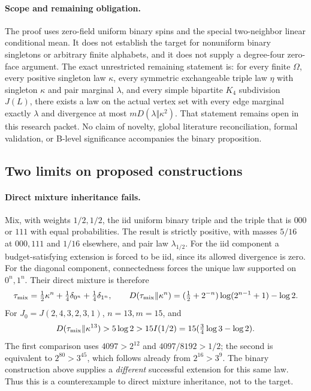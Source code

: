 \paragraph{Scope and remaining obligation.}
The proof uses zero-field uniform binary spins and the special
two-neighbor linear conditional mean.  It does not establish the
target for nonuniform binary singletons or arbitrary finite alphabets,
and it does not supply a degree-four zero-face argument.
The exact unrestricted remaining statement is: for every finite
$\Omega$, every positive singleton law $\kappa$, every symmetric
exchangeable triple law $\eta$ with singleton $\kappa$ and pair marginal
$\lambda$, and every simple bipartite $K_4$ subdivision $J(L)$, there
exists a law on the actual vertex set with every edge marginal exactly
$\lambda$ and divergence at most $mD(\lambda\Vert\kappa^2)$.
That statement remains open in this research packet.  No claim of
novelty, global literature reconciliation, formal validation, or
B-level significance accompanies the binary proposition.

\subsection{Two limits on proposed constructions}

\paragraph{Direct mixture inheritance fails.}
Mix, with weights $1/2,1/2$, the iid uniform binary triple and the triple
that is $000$ or $111$ with equal probabilities.  The result is strictly
positive, with masses $5/16$ at $000,111$ and $1/16$ elsewhere, and pair
law $\lambda_{1/2}$.
For the iid component a budget-satisfying extension is forced to be iid,
since its allowed divergence is zero.  For the diagonal component,
connectedness forces the unique law supported on $0^n,1^n$.
Their direct mixture is therefore
\[
 \tau_{\rm mix}=\tfrac12\kappa^n
       +\tfrac14\delta_{0^n}+\tfrac14\delta_{1^n},\qquad
 D(\tau_{\rm mix}\Vert\kappa^n)
       =(\tfrac12+2^{-n})\log(2^{n-1}+1)-\log2.
\]
For $J_0=J(2,4,3,2,3,1)$, $n=13,m=15$, and
\[
 D(\tau_{\rm mix}\Vert\kappa^{13})>5\log2
       >15I(1/2)=15(\tfrac34\log3-\log2).
\]
The first comparison uses $4097>2^{12}$ and $4097/8192>1/2$;
the second is equivalent to $2^{80}>3^{45}$, which follows already
from $2^{16}>3^9$.
The binary construction above supplies a \emph{different} successful
extension for this same law.  Thus this is a counterexample to direct
mixture inheritance, not to the target.

